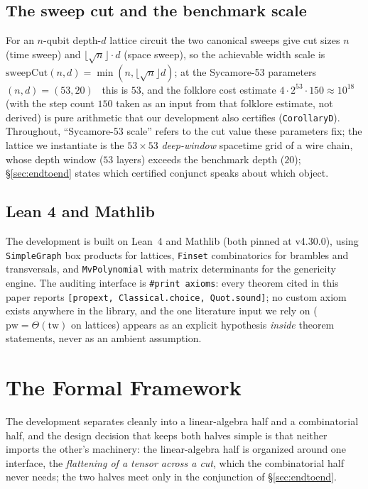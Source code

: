 \documentclass[sigplan,10pt,screen,review,anonymous]{acmart}
\newcommand{\pw}{\mathrm{pw}}
\newcommand{\tw}{\mathrm{tw}}
\begin{document}
\subsection{The sweep cut and the benchmark scale}
For an $n$-qubit depth-$d$ lattice circuit the two canonical sweeps give cut sizes $n$
(time sweep) and $\lfloor\sqrt{n}\rfloor\cdot d$ (space sweep), so the achievable width
scale is $\mathrm{sweepCut}(n,d)=\min(n,\lfloor\sqrt{n}\rfloor d)$; at the Sycamore-53
parameters $(n,d)=(53,20)$~\cite{arute2019quantum} this is $53$, and the folklore cost estimate
$4\cdot 2^{53}\cdot 150 \approx 10^{18}$ (with the step count $150$ taken as an input
from that folklore estimate, not derived) is pure arithmetic that our development also
certifies (\lstinline|CorollaryD|). Throughout, ``Sycamore-53 scale'' refers to the cut
value these parameters fix; the lattice we instantiate is the $53\times53$
\emph{deep-window} spacetime grid of a wire chain, whose depth window ($53$ layers)
exceeds the benchmark depth ($20$); \S\ref{sec:endtoend} states which certified
conjunct speaks about which object.

\subsection{Lean 4 and Mathlib}
The development is built on Lean~4 and Mathlib (both pinned at v4.30.0), using
\lstinline|SimpleGraph| box products for lattices, \lstinline|Finset| combinatorics for
brambles and transversals, and \lstinline|MvPolynomial| with matrix determinants for the
genericity engine. The auditing interface is \texttt{\#print axioms}: every theorem cited in
this paper reports \texttt{[propext, Classical.choice, Quot.sound]}; no custom axiom
exists anywhere in the library, and the one literature input we rely on
($\pw=\Theta(\tw)$ on lattices) appears as an explicit hypothesis \emph{inside} theorem
statements, never as an ambient assumption.

\section{The Formal Framework}\label{sec:framework}

The development separates cleanly into a linear-algebra half and a combinatorial half, and
the design decision that keeps both halves simple is that neither imports the other's
machinery: the linear-algebra half is organized around one interface, the
\emph{flattening of a tensor across a cut}, which the combinatorial half never needs;
the two halves meet only in the conjunction of \S\ref{sec:endtoend}.
\end{document}
